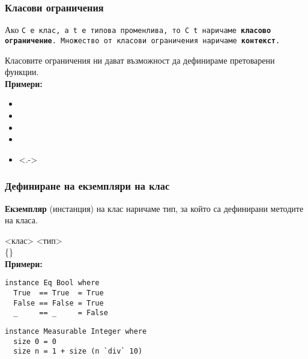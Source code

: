 \documentclass[alsotrans]{beamerswitch}
\begin{document}
\begin{frame}
  \frametitle{Класови ограничения}
  \begin{definition}
    Ако \tt{C} e клас, а \tt{t} е типова променлива, то \tt{C t} наричаме \textbf{класово ограничение}. \pause Множество от класови ограничения наричаме \textbf{контекст}.
  \end{definition}
  \pause
  Класовите ограничения ни дават възможност да дефинираме претоварени функции.\\[2ex]
  \pause
  \textbf{Примери:}
  \begin{itemize}[<+->]
  \item {}
  \item {}
  \item {}
  \item {}
  \item<.-> 
  \end{itemize}
\end{frame}

\begin{frame}[fragile]
  \frametitle{Дефиниране на екземпляри на клас}
  \begin{definition}
    \textbf{Екземпляр} (инстанция) на клас наричаме тип, за който са дефинирани методите на класа.
  \end{definition}
  \pause
   <клас> <тип> \\
  \hspace{1em} \{<дефиниция-на-метод>\}\\[1ex]
  \pause
  \textbf{Примери:}%
  \vspace{-1ex}
\begin{lstlisting}
instance Eq Bool where
  True  == True  = True
  False == False = True
  _     == _     = False
\end{lstlisting}\pause%
\begin{lstlisting}
instance Measurable Integer where
  size 0 = 0
  size n = 1 + size (n `div` 10)
\end{lstlisting}
\end{frame}
\end{document}
